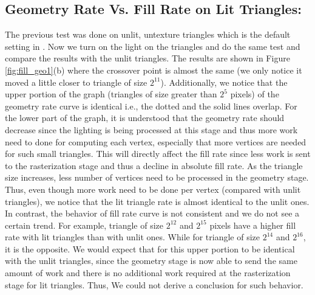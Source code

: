 \subsection{Geometry Rate Vs. Fill Rate on Lit Triangles:}\label{sec:lit}
The previous test was done on unlit, untexture triangles which is the default setting in \protect{\wes}. Now we turn on the light on the triangles and do the same test and compare the results with the unlit triangles. The results are shown in Figure \ref{fig:fill_geo1}(b) where the crossover point is almost the same (we only notice it moved a little closer to triangle of size $2^{11}$). Additionally, we notice that the upper portion of the graph (triangles of size greater than $2^{5}$ pixels) of the geometry rate curve is identical i.e., the dotted and the solid lines overlap. For the lower part of the graph, it is understood that the geometry rate should decrease since the lighting is being processed at this stage and thus more work need to done for computing each vertex, especially that more vertices are needed for such small triangles. This will directly affect the fill rate since less work is sent to the rasterization stage and thus a decline in absolute fill rate. As the triangle size increases, less number of vertices need to be processed in the geometry stage. Thus, even though more work need to be done per vertex (compared with unlit triangles), we notice that the lit triangle rate is almost identical to the unlit ones. In contrast, the behavior of fill rate curve is not consistent and we do not see a certain trend. For example, triangle of size $2^{12}$ and $ 2^{15}$ pixels have a higher fill rate with lit triangles than with unlit ones. While for triangle of size $2^{14}$ and $2^{16}$, it is the opposite. We would expect that for this upper portion to be identical with the unlit triangles, since the geometry stage is now able to send the same amount of work and there is no additional work required at the rasterization stage for lit triangles. Thus, We could not derive a conclusion for such behavior.

